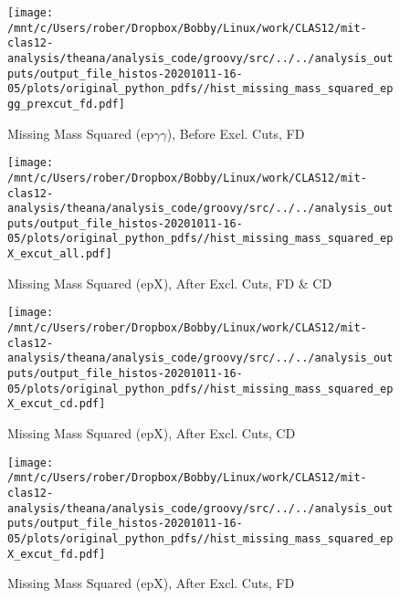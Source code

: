 \documentclass{article}
\begin{document}
\begin{landscape}
    \begin{figure}[h]
        \centering

        \texttt{[image: /mnt/c/Users/rober/Dropbox/Bobby/Linux/work/CLAS12/mit-clas12-analysis/theana/analysis\_code/groovy/src/../../analysis\_outputs/output\_file\_histos-20201011-16-05/plots/original\_python\_pdfs//hist\_missing\_mass\_squared\_epgg\_prexcut\_fd.pdf]}
        \captionsetup{textformat=empty,labelformat=blank}
        \caption{Missing Mass Squared (ep$\gamma$$\gamma$), Before Excl. Cuts, FD}
    \end{figure}
    \clearpage
    
    \begin{figure}[h]
        \centering

        \texttt{[image: /mnt/c/Users/rober/Dropbox/Bobby/Linux/work/CLAS12/mit-clas12-analysis/theana/analysis\_code/groovy/src/../../analysis\_outputs/output\_file\_histos-20201011-16-05/plots/original\_python\_pdfs//hist\_missing\_mass\_squared\_epX\_excut\_all.pdf]}
        \captionsetup{textformat=empty,labelformat=blank}
        \caption{Missing Mass Squared (epX), After Excl. Cuts, FD \& CD}
    \end{figure}
    \clearpage
    
    \begin{figure}[h]
        \centering

        \texttt{[image: /mnt/c/Users/rober/Dropbox/Bobby/Linux/work/CLAS12/mit-clas12-analysis/theana/analysis\_code/groovy/src/../../analysis\_outputs/output\_file\_histos-20201011-16-05/plots/original\_python\_pdfs//hist\_missing\_mass\_squared\_epX\_excut\_cd.pdf]}
        \captionsetup{textformat=empty,labelformat=blank}
        \caption{Missing Mass Squared (epX), After Excl. Cuts, CD}
    \end{figure}
    \clearpage
    
    \begin{figure}[h]
        \centering

        \texttt{[image: /mnt/c/Users/rober/Dropbox/Bobby/Linux/work/CLAS12/mit-clas12-analysis/theana/analysis\_code/groovy/src/../../analysis\_outputs/output\_file\_histos-20201011-16-05/plots/original\_python\_pdfs//hist\_missing\_mass\_squared\_epX\_excut\_fd.pdf]}
        \captionsetup{textformat=empty,labelformat=blank}
        \caption{Missing Mass Squared (epX), After Excl. Cuts, FD}
    \end{figure}
    \clearpage
    
    \begin{figure}[h]
        \centering


\end{figure}
\end{landscape}
\end{document}
